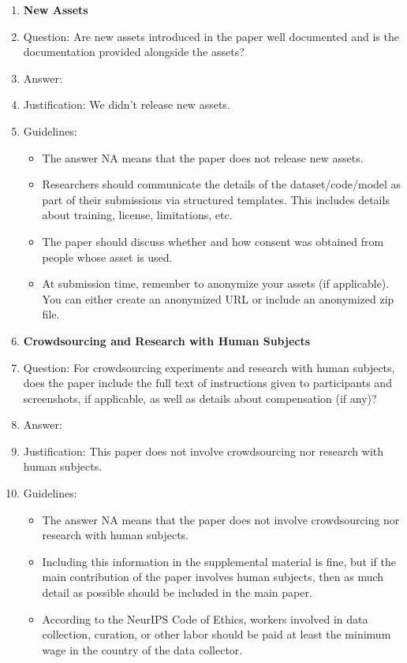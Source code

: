 \documentclass{article}
\begin{document}
\begin{enumerate}
\item {\bf New Assets}
    \item[] Question: Are new assets introduced in the paper well documented and is the documentation provided alongside the assets?
    \item[] Answer: \answerNA{} %
    \item[] Justification: We didn't release new assets.
    \item[] Guidelines:
    \begin{itemize}
        \item The answer NA means that the paper does not release new assets.
        \item Researchers should communicate the details of the dataset/code/model as part of their submissions via structured templates. This includes details about training, license, limitations, etc. 
        \item The paper should discuss whether and how consent was obtained from people whose asset is used.
        \item At submission time, remember to anonymize your assets (if applicable). You can either create an anonymized URL or include an anonymized zip file.
    \end{itemize}

\item {\bf Crowdsourcing and Research with Human Subjects}
    \item[] Question: For crowdsourcing experiments and research with human subjects, does the paper include the full text of instructions given to participants and screenshots, if applicable, as well as details about compensation (if any)? 
    \item[] Answer: \answerNA{} %
    \item[] Justification: This paper does not involve crowdsourcing nor research with human subjects.
    \item[] Guidelines:
    \begin{itemize}
        \item The answer NA means that the paper does not involve crowdsourcing nor research with human subjects.
        \item Including this information in the supplemental material is fine, but if the main contribution of the paper involves human subjects, then as much detail as possible should be included in the main paper. 
        \item According to the NeurIPS Code of Ethics, workers involved in data collection, curation, or other labor should be paid at least the minimum wage in the country of the data collector. 
    \end{itemize}


\end{enumerate}
\end{document}
